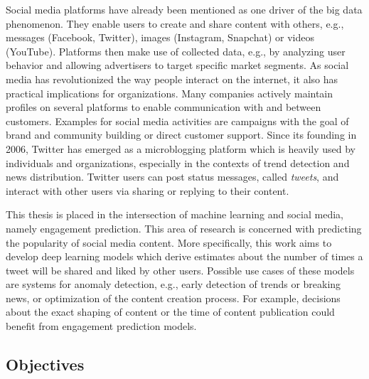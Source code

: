 Social media platforms have already been mentioned as one driver of the big
data phenomenon.
They enable users to create and share content with others, e.g., messages
(Facebook, Twitter), images (Instagram, Snapchat) or videos (YouTube).
Platforms then make use of collected data, e.g., by analyzing user behavior and
allowing advertisers to target specific market segments.
As social media has revolutionized the way people interact on the internet,
it also has practical implications for organizations.
Many companies actively maintain profiles on several platforms to enable
communication with and between customers.
Examples for social media activities are campaigns with the goal of brand
and community building or direct customer support.
Since its founding in 2006, Twitter has emerged as a microblogging platform
which is heavily used by individuals and organizations, especially in the
contexts of trend detection and news distribution.
Twitter users can post status messages, called \textit{tweets}, and interact
with other users via sharing or replying to their content.

This thesis is placed in the intersection of machine learning and social media,
namely engagement prediction.
This area of research is concerned with predicting the popularity of social
media content.
More specifically, this work aims to develop deep learning models which derive
estimates about the number of times a tweet will be shared and liked by other users.
Possible use cases of these models are systems for anomaly detection, e.g.,
early detection of trends or breaking news, or optimization of the content
creation process.
For example, decisions about the exact shaping of content or the time of
content publication could benefit from engagement prediction models.

\subsection{Objectives}
\label{sec:objectives}


